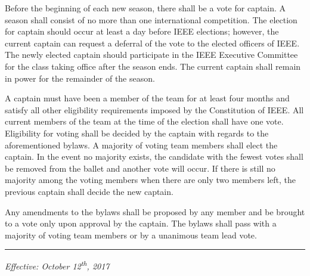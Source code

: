 \documentclass[12pt]{constitution}
\begin{document}
\label{art:elect}

Before the beginning of each new season, there shall be a vote for captain. A season shall consist of no more than one international competition. The election for captain should occur at least a day before IEEE elections; however, the current captain can request a deferral of the vote to the elected officers of IEEE. The newly elected captain should participate in the IEEE Executive Committee for the class taking office after the season ends. The current captain shall remain in power for the remainder of the season.

A captain must have been a member of the team for at least four months and satisfy all other eligibility requirements imposed by the Constitution of IEEE. All current members of the team at the time of the election shall have one vote. Eligibility for voting shall be decided by the captain with regards to the aforementioned bylaws. A majority of voting team members shall elect the captain. In the event no majority exists, the candidate with the fewest votes shall be removed from the ballet and another vote will occur. If there is still no majority among the voting members when there are only two members left, the previous captain shall decide the new captain.


\label{art:bylaw}

Any amendments to the bylaws shall be proposed by any member and be brought to a vote only upon approval by the captain. The bylaws shall pass with a majority of voting team members or by a unanimous team lead vote.

\vspace{12pt}
\hrule

\textit{Effective: October 12\textsuperscript{th}, 2017}


\setcounter{tocdepth}{1}
\end{document}
